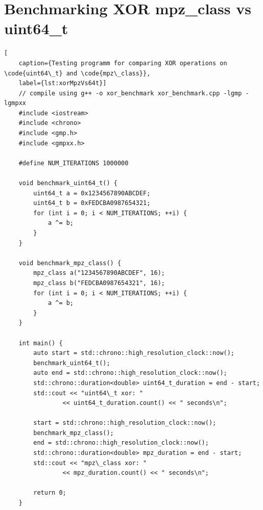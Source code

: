 \section{Benchmarking XOR mpz\_class vs uint64\_t}
\begin{lstlisting}[
    caption={Testing programm for comparing XOR operations on \code{uint64\_t} and \code{mpz\_class}}, 
    label={lst:xorMpzVs64t}]
    // compile using g++ -o xor_benchmark xor_benchmark.cpp -lgmp -lgmpxx
    #include <iostream>
    #include <chrono>
    #include <gmp.h>
    #include <gmpxx.h>

    #define NUM_ITERATIONS 1000000

    void benchmark_uint64_t() {
        uint64_t a = 0x1234567890ABCDEF;
        uint64_t b = 0xFEDCBA0987654321;
        for (int i = 0; i < NUM_ITERATIONS; ++i) {
            a ^= b;
        }
    }

    void benchmark_mpz_class() {
        mpz_class a("1234567890ABCDEF", 16); 
        mpz_class b("FEDCBA0987654321", 16);
        for (int i = 0; i < NUM_ITERATIONS; ++i) {
            a ^= b;
        }
    }

    int main() {
        auto start = std::chrono::high_resolution_clock::now();
        benchmark_uint64_t();
        auto end = std::chrono::high_resolution_clock::now();
        std::chrono::duration<double> uint64_t_duration = end - start;
        std::cout << "uint64\_t xor: " 
                << uint64_t_duration.count() << " seconds\n";

        start = std::chrono::high_resolution_clock::now();
        benchmark_mpz_class();
        end = std::chrono::high_resolution_clock::now();
        std::chrono::duration<double> mpz_duration = end - start;
        std::cout << "mpz\_class xor: " 
                << mpz_duration.count() << " seconds\n";

        return 0;
    }

\end{lstlisting}